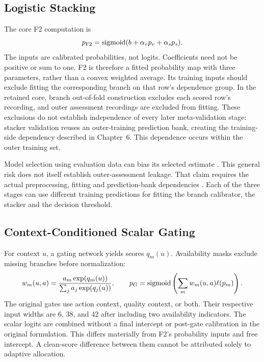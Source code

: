 \subsection{Logistic Stacking}
The core F2 computation is
\begin{equation}
 p_{\mathrm{F2}}=\operatorname{sigmoid}(b+\alpha_v p_v+\alpha_s p_s).
 \label{eq:f2}
\end{equation}
The inputs are calibrated probabilities, not logits. Coefficients need not be positive or sum to one. F2 is therefore a fitted probability map with three parameters, rather than a convex weighted average. Its training inputs should exclude fitting the corresponding branch on that row's dependence group. In the retained core, branch out-of-fold construction excludes each scored row's recording, and outer assessment recordings are excluded from fitting. These exclusions do not establish independence of every later meta-validation stage: stacker validation reuses an outer-training prediction bank, creating the training-side dependency described in Chapter~6. This dependence occurs within the outer training set.

Model selection using evaluation data can bias its selected estimate \citep{P004}. This general risk does not itself establish outer-assessment leakage. That claim requires the actual preprocessing, fitting and prediction-bank dependencies \citep{P017}. Each of the three stages can use different training predictions for fitting the branch calibrator, the stacker and the decision threshold.

\subsection{Context-Conditioned Scalar Gating}
For context $u$, a gating network yields scores $q_m(u)$. Availability masks exclude missing branches before normalization:
\begin{equation}
 w_m(u,a)=\frac{a_m\exp(q_m(u))}{\sum_j a_j\exp(q_j(u))},\qquad
 p_G=\operatorname{sigmoid}\left(\sum_m w_m(u,a)\ell(p_m)\right).
 \label{eq:gate}
\end{equation}
The original gates use action context, quality context, or both. Their respective input widths are 6, 38, and 42 after including two availability indicators. The scalar logits are combined without a final intercept or post-gate calibration in the original formulation. This differs materially from F2's probability inputs and free intercept. A clean-score difference between them cannot be attributed solely to adaptive allocation.

